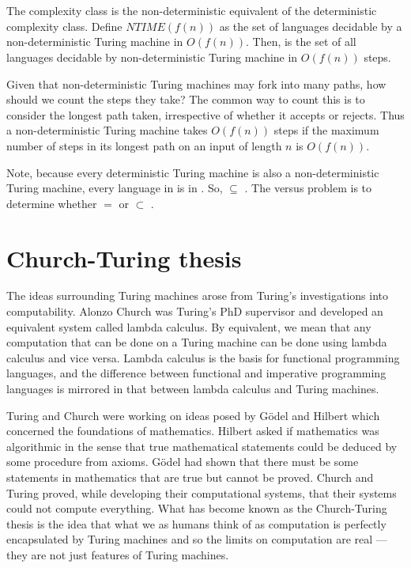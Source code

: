 \section{}
  The  complexity class is the non-deterministic equivalent of the deterministic  complexity class.
  Define \( NTIME(f(n)) \) as the set of languages decidable by a non-deterministic Turing machine in \( O(f(n)) \).
  Then,  is the set of all languages decidable by non-deterministic Turing machine in \( O(f(n)) \) steps.

  Given that non-deterministic Turing machines may fork into many paths, how should we count the steps they take?
  The common way to count this is to consider the longest path taken, irrespective of whether it accepts or rejects.
  Thus a non-deterministic Turing machine takes \(O(f(n))\) steps if the maximum number of steps in its longest path on an input of length \(n\) is \(O(f(n))\).

  Note, because every deterministic Turing machine is also a non-deterministic Turing machine, every language in  is in .
  So,  \( \subseteq \) .
  The  versus  problem is to determine whether  \( = \)  or  \( \subset \) .

\section{Church-Turing thesis}
  The ideas surrounding Turing machines arose from Turing's investigations into computability.
  Alonzo Church was Turing's PhD supervisor and developed an equivalent system called lambda calculus.
  By equivalent, we mean that any computation that can be done on a Turing machine can be done using lambda calculus and vice versa.
  Lambda calculus is the basis for functional programming languages, and the difference between functional and imperative programming languages is mirrored in that between lambda calculus and Turing machines.
  
  Turing and Church were working on ideas posed by G{\"o}del and Hilbert which concerned the foundations of mathematics.
  Hilbert asked if mathematics was algorithmic in the sense that true mathematical statements could be deduced by some procedure from axioms.
  G{\"o}del had shown that there must be some statements in mathematics that are true but cannot be proved.
  Church and Turing proved, while developing their computational systems, that their systems could not compute everything.
  What has become known as the Church-Turing thesis is the idea that what we as humans think of as computation is perfectly encapsulated by Turing machines and so the limits on computation are real --- they are not just features of Turing machines.

